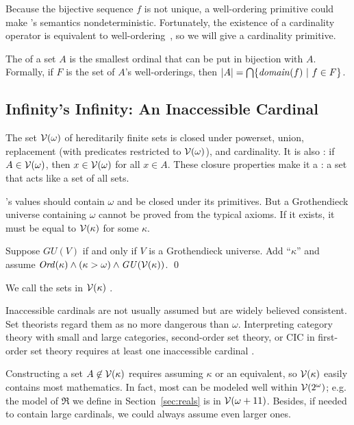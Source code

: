 Because the bijective sequence $f$ is not unique, a well-ordering primitive could make \targetlang's semantics nondeterministic.
Fortunately, the existence of a cardinality operator is equivalent to well-ordering~\cite{cit:tzouvaras-2005sl-card}, so we will give \targetlang a cardinality primitive.

The  of a set $A$ is the smallest ordinal that can be put in bijection with $A$. Formally, if $F$ is the set of $A$'s well-orderings, then $|A| = \textstyle\bigcap \lbrace {\mathit{domain}(f)} \ \lvert\ {f \in F} \rbrace$.


\subsection{Infinity's Infinity: An Inaccessible Cardinal}

The set $\mathcal{V}(\omega)$ of hereditarily finite sets is closed under powerset, union, replacement (with predicates restricted to $\mathcal{V}(\omega)$), and cardinality. It is also : if $A \in \mathcal{V}(\omega)$, then $x \in \mathcal{V}(\omega)$ for all $x \in A$. These closure properties make it a : a set that acts like a set of all sets.

\targetlang's values should contain $\omega$ and be closed under its primitives. But a Grothendieck universe containing $\omega$ cannot be proved from the typical axioms. If it exists, it must be equal to $\mathcal{V}(\kappa)$ for some  $\kappa$.
\begin{axiom}
Suppose $\mathit{GU}(V)$ if and only if $V$ is a Grothendieck universe. Add ``$\kappa$'' and assume $\mathit{Ord}(\kappa) \wedge (\kappa > \omega) \wedge \mathit{GU}(\mathcal{V}(\kappa))$.
\qed
\end{axiom}
We call the sets in $\mathcal{V}(\kappa)$ .

Inaccessible cardinals are not usually assumed but are widely believed consistent. Set theorists regard them as no more dangerous than $\omega$. Interpreting category theory with small and large categories, second-order set theory, or CIC in first-order set theory requires at least one inaccessible cardinal \cite{cit:uzquiano-1999-models-zf2,cit:barras-2010-sets-coq,cit:werner-1997-sets-types}.

Constructing a set $A \not\in \mathcal{V}(\kappa)$ requires assuming $\kappa$ or an equivalent, so $\mathcal{V}(\kappa)$ easily contains most mathematics. In fact, most can be modeled well within $\mathcal{V}(2^\omega)$; e.g. the model of $\Re$ we define in Section~\ref{sec:reals} is in $\mathcal{V}(\omega + 11)$. Besides, if \targetlang needed to contain large cardinals, we could always assume even larger ones.

